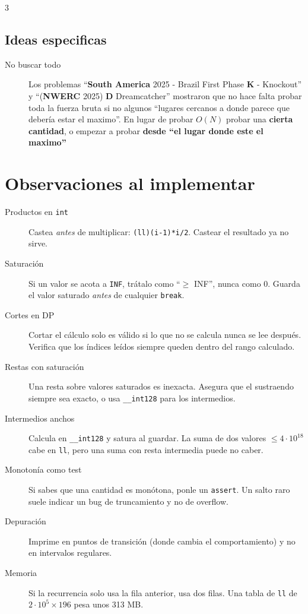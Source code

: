 \documentclass[8pt, spanish, mexico, letterpaper]{extarticle}
\newcommand{\<}{<}
\begin{document}
\begin{multicols*}{3}
\subsection{Ideas especificas}
\begin{description}
    \item[No buscar todo] Los problemas ``\textbf{South America} 2025 - Brazil First Phase \textbf{K} - Knockout'' y ``(\textbf{NWERC} 2025) \textbf{D} Dreamcatcher'' mostraron que no hace falta probar toda la fuerza bruta si no algunos ``lugares cercanos a donde parece que debería estar el maximo''. En lugar de probar $O(N)$ probar una \textbf{cierta cantidad}, o empezar a probar \textbf{desde ``el lugar donde este el maximo'' }
\end{description}

\section{Observaciones al implementar}
\begin{description}
  \item[Productos en \texttt{int}] Castea \emph{antes} de multiplicar: \texttt{(ll)(i-1)*i/2}. Castear el resultado ya no sirve.
  \item[Saturación] Si un valor se acota a \texttt{INF}, trátalo como ``$\geq$ INF'', nunca como 0. Guarda el valor saturado \emph{antes} de cualquier \texttt{break}.
  \item[Cortes en DP] Cortar el cálculo solo es válido si lo que no se calcula nunca se lee después. Verifica que los índices leídos siempre queden dentro del rango calculado.
  \item[Restas con saturación] Una resta sobre valores saturados es inexacta. Asegura que el sustraendo siempre sea exacto, o usa \texttt{\_\_int128} para los intermedios.
  \item[Intermedios anchos] Calcula en \texttt{\_\_int128} y satura al guardar. La suma de dos valores $\leq 4\cdot10^{18}$ cabe en \texttt{ll}, pero una suma con resta intermedia puede no caber.
  \item[Monotonía como test] Si sabes que una cantidad es monótona, ponle un \texttt{assert}. Un salto raro suele indicar un bug de truncamiento y no de overflow.
  \item[Depuración] Imprime en puntos de transición (donde cambia el comportamiento) y no en intervalos regulares.
  \item[Memoria] Si la recurrencia solo usa la fila anterior, usa dos filas. Una tabla de \texttt{ll} de $2\cdot10^5\times196$ pesa unos 313 MB.
\end{description}



\end{multicols*}
\end{document}
